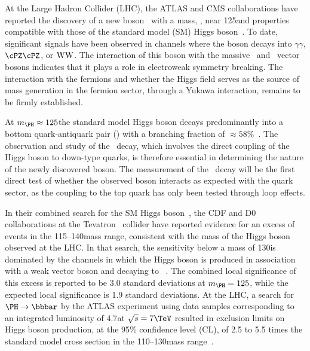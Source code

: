 \documentclass[12pt,twoside,a4paper,cmspaper,final,collab]{cms-tdr}
\begin{document}
At the Large Hadron Collider (LHC), the ATLAS and CMS collaborations have reported the
discovery of a new
boson~\cite{Chatrchyan:2012ufa,Aad:2012tfa} with a mass, \mH, near
125\GeV and properties compatible with those of the
standard model (SM) Higgs
boson~\cite{Englert:1964et,Higgs:1964ia,Higgs:1964pj,Guralnik:1964eu,Higgs:1966ev,Kibble:1967sv}. To
date, significant signals have been observed in
channels where the boson decays into $\gamma \gamma$, $\cPZ\cPZ$, or $\mathrm{W}\mathrm{W}$.
The interaction of this boson with the massive \PW\ and \cPZ\  vector
bosons indicates that it plays a role in electroweak symmetry
breaking. The interaction with the fermions and whether the Higgs
field serves as the source of mass generation in the fermion sector,
through a Yukawa interaction, remains to be firmly established.


At $\mH\approx 125$\GeV  the standard model Higgs boson decays
predominantly into a bottom quark-antiquark pair (\bbbar) with a
branching fraction of ${\approx}58\%$~\cite{Dittmaier:2011ti}. The
observation and study of the \HBB\ decay, which involves the direct
coupling of the Higgs boson to down-type quarks, is therefore
essential in determining the nature of the newly discovered boson.
The measurement of the \HBB\ decay  will be the first direct test of whether the
observed boson interacts as expected with the quark sector, as the
coupling to the top quark has only been tested through loop effects.

In their combined search for the SM Higgs boson~\cite{PhysRevD.88.052014},
the CDF and D0 collaborations at the Tevatron  \Pp\Pap\ collider have reported evidence for
an excess of events in the 115--140\GeV mass range, consistent with the mass of the Higgs boson observed at the LHC.
In that search, the sensitivity below a mass of 130\GeV is dominated by the channels in
which the Higgs boson is produced in association with a weak vector boson and decaying to
\bbbar~\cite{PhysRevLett.109.071804}. The combined local significance
  of this excess is reported to be 3.0 standard deviations at
  $\mH=125$\GeV, while the expected local significance is 1.9 standard deviations.  At the LHC, a search for $\PH\to \bbbar$ by the ATLAS
experiment using data samples corresponding to an integrated
luminosity of $4.7$\fbinv at $\sqrt{s}=7\TeV$ resulted in exclusion limits on Higgs boson
production, at the 95\% confidence level (CL), of 2.5 to 5.5 times the
standard model cross section in the 110--130\GeV mass range~\cite{Aad:2012gxa}.
\end{document}
